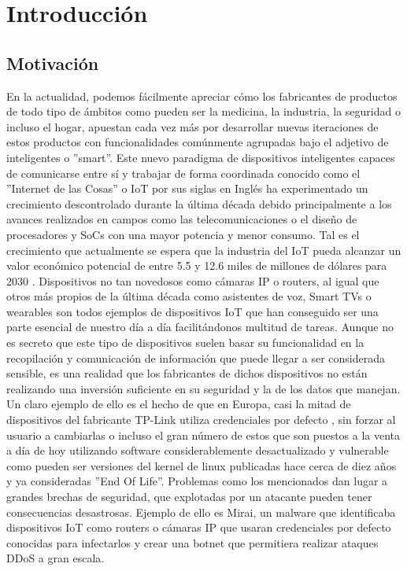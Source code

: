 \chapter{Introducción}
\label{introduccion}

\section{Motivación}
En la actualidad, podemos fácilmente apreciar cómo los fabricantes de productos de todo tipo de
ámbitos como pueden ser la medicina, la industria, la seguridad o incluso el hogar, apuestan cada vez 
más por desarrollar nuevas iteraciones de estos productos con funcionalidades comúnmente agrupadas bajo el 
adjetivo de inteligentes o ''smart''. Este nuevo paradigma de dispositivos inteligentes capaces de 
comunicarse entre sí y trabajar de forma coordinada conocido como el ''Internet de las Cosas'' o IoT por 
sus siglas en Inglés ha experimentado un crecimiento descontrolado durante la última década debido 
principalmente a los avances realizados en campos como las telecomunicaciones o el diseño de procesadores y
SoCs con una mayor potencia y menor consumo. Tal es el crecimiento que actualmente se espera que la industria del
IoT pueda alcanzar un valor económico potencial de entre 5.5 y 12.6 miles de millones de dólares para
2030 \cite{McKinsey}.
\bigskip
Dispositivos no tan novedosos como cámaras IP o routers, al igual que otros más 
propios de la última década como asistentes de voz, Smart TVs o wearables son todos ejemplos 
de dispositivos IoT que han conseguido ser una parte esencial de nuestro día a día facilitándonos
multitud de tareas. Aunque no es secreto que este tipo de dispositivos suelen basar su funcionalidad en 
la recopilación y comunicación de información que puede llegar a ser considerada sensible, es una realidad 
que los fabricantes de dichos dispositivos no están realizando una inversión suficiente en su seguridad y 
la de los datos que manejan. Un claro ejemplo de ello es el hecho de que en Europa, casi la mitad 
de dispositivos del fabricante TP-Link utiliza credenciales por defecto \cite{Deepak}, sin forzar al usuario 
a cambiarlas o incluso el gran número de estos que son puestos a la venta a día de hoy utilizando software 
considerablemente desactualizado y vulnerable como pueden ser versiones del kernel de linux publicadas hace cerca de 
diez años y ya consideradas ''End Of Life''. Problemas como los mencionados dan lugar a grandes brechas de
seguridad, que explotadas por un atacante pueden tener consecuencias desastrosas. Ejemplo de ello es 
Mirai\cite{mirai}, un malware que identificaba dispositivos IoT como routers o cámaras IP que usaran credenciales 
por defecto conocidas para infectarlos y crear una botnet que permitiera realizar ataques DDoS a gran escala.\\

